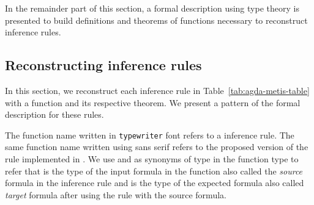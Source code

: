 \documentclass[../main.tex]{subfiles}
\begin{document}
In the remainder part of this section, a formal description using
type theory is presented to build definitions and theorems of
functions necessary to reconstruct \Metis inference rules.


\subsection{Reconstructing \Metis inference rules}
\label{ssec:emulating-inferences}

In this section, we reconstruct each \Metis inference rule
in Table~\ref{tab:agda-metis-table} with a
function and its respective theorem. We present a pattern of the
formal description for these rules.

\begin{notation}
The function name written in \texttt{typewriter} font refers to
a \Metis inference rule.
The same function name written using \textsf{sans serif} refers to the proposed
version of the rule implemented in \cite{AgdaProp,AgdaMetis}.
We use \Source and \Target as synonyms of \Prop type in the
function type to refer that \Source is the type of the input formula in
the function also called the \emph{source} formula in the inference rule and
\Target is the type of the expected formula also called \emph{target} formula after using the rule with the source formula.
\end{notation}
\end{document}
